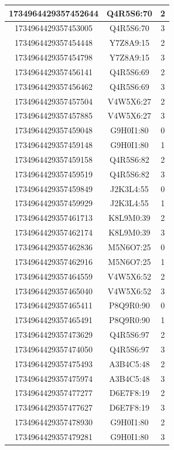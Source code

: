 \begin{table}[h]
\begin{tabular}{| c | c | c |}
		1734964429357452644 & Q4R5S6:70 & 2 \\\hline
		1734964429357453005 & Q4R5S6:70 & 3 \\\hline
		1734964429357454448 & Y7Z8A9:15 & 2 \\\hline
		1734964429357454798 & Y7Z8A9:15 & 3 \\\hline
		1734964429357456141 & Q4R5S6:69 & 2 \\\hline
		1734964429357456462 & Q4R5S6:69 & 3 \\\hline
		1734964429357457504 & V4W5X6:27 & 2 \\\hline
		1734964429357457885 & V4W5X6:27 & 3 \\\hline
		1734964429357459048 & G9H0I1:80 & 0 \\\hline
		1734964429357459148 & G9H0I1:80 & 1 \\\hline
		1734964429357459158 & Q4R5S6:82 & 2 \\\hline
		1734964429357459519 & Q4R5S6:82 & 3 \\\hline	
		1734964429357459849 & J2K3L4:55 & 0 \\\hline
		1734964429357459929 & J2K3L4:55 & 1 \\\hline
		1734964429357461713 & K8L9M0:39 & 2 \\\hline
		1734964429357462174 & K8L9M0:39 & 3 \\\hline
		1734964429357462836 & M5N6O7:25 & 0 \\\hline
		1734964429357462916 & M5N6O7:25 & 1 \\\hline
		1734964429357464559 & V4W5X6:52 & 2 \\\hline
		1734964429357465040 & V4W5X6:52 & 3 \\\hline
		1734964429357465411 & P8Q9R0:90 & 0 \\\hline
		1734964429357465491 & P8Q9R0:90 & 1 \\\hline
		1734964429357473629 & Q4R5S6:97 & 2 \\\hline
		1734964429357474050 & Q4R5S6:97 & 3 \\\hline
		1734964429357475493 & A3B4C5:48 & 2 \\\hline
		1734964429357475974 & A3B4C5:48 & 3 \\\hline
		1734964429357477277 & D6E7F8:19 & 2 \\\hline
		1734964429357477627 & D6E7F8:19 & 3 \\\hline
		1734964429357478930 & G9H0I1:80 & 2 \\\hline
		1734964429357479281 & G9H0I1:80 & 3 \\\hline

\end{tabular}
\end{table}
